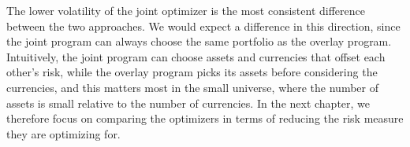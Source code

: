 The lower volatility of the joint optimizer is the most consistent difference between the two approaches. We would
expect a difference in this direction, since the joint program can always choose the same portfolio as the
overlay program.
Intuitively, the joint program can choose assets and currencies that offset each other's risk, while the overlay program picks
its assets before considering the currencies, and this matters most in the small universe, where the number of assets is
small relative to the number of currencies. In the next chapter, we therefore focus on comparing the optimizers in terms
of reducing the risk measure they are optimizing for.
